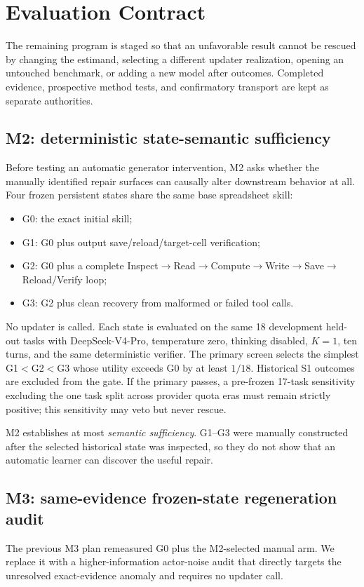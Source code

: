 \section{Evaluation Contract}
\label{sec:evaluation}

The remaining program is staged so that an unfavorable result cannot be rescued by changing the estimand, selecting a different updater realization, opening an untouched benchmark, or adding a new model after outcomes. Completed evidence, prospective method tests, and confirmatory transport are kept as separate authorities.

\subsection{M2: deterministic state-semantic sufficiency}
Before testing an automatic generator intervention, M2 asks whether the manually identified repair surfaces can causally alter downstream behavior at all. Four frozen persistent states share the same base spreadsheet skill:
\begin{itemize}
    \item G0: the exact initial skill;
    \item G1: G0 plus output save/reload/target-cell verification;
    \item G2: G0 plus a complete Inspect$\rightarrow$Read$\rightarrow$Compute$\rightarrow$Write$\rightarrow$Save$\rightarrow$Reload/Verify loop;
    \item G3: G2 plus clean recovery from malformed or failed tool calls.
\end{itemize}
No updater is called. Each state is evaluated on the same 18 development held-out tasks with DeepSeek-V4-Pro, temperature zero, thinking disabled, $K=1$, ten turns, and the same deterministic verifier. The primary screen selects the simplest G1$<$G2$<$G3 whose utility exceeds G0 by at least $1/18$. Historical S1 outcomes are excluded from the gate. If the primary passes, a pre-frozen 17-task sensitivity excluding the one task split across provider quota eras must remain strictly positive; this sensitivity may veto but never rescue.

M2 establishes at most \emph{semantic sufficiency}. G1--G3 were manually constructed after the selected historical state was inspected, so they do not show that an automatic learner can discover the useful repair.

\subsection{M3: same-evidence frozen-state regeneration audit}
The previous M3 plan remeasured G0 plus the M2-selected manual arm. We replace it with a higher-information actor-noise audit that directly targets the unresolved exact-evidence anomaly and requires no updater call.

